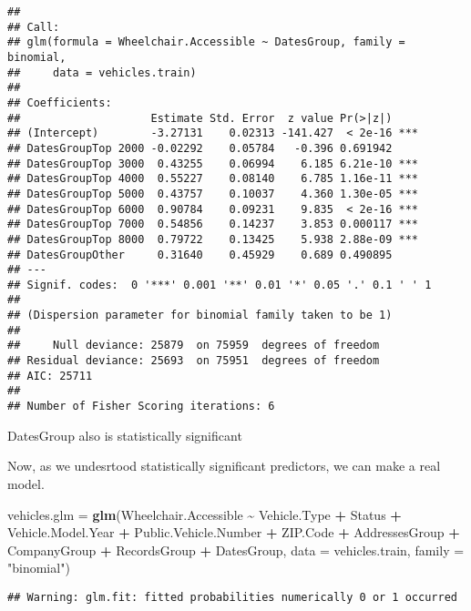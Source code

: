 \documentclass[
]{article}
\newenvironment{Shaded}{\begin{snugshade}}{\end{snugshade}}
\newcommand{\AttributeTok}[1]{\textcolor[rgb]{0.13,0.29,0.53}{#1}}
\newcommand{\FunctionTok}[1]{\textcolor[rgb]{0.13,0.29,0.53}{\textbf{#1}}}
\newcommand{\NormalTok}[1]{#1}
\newcommand{\OtherTok}[1]{\textcolor[rgb]{0.56,0.35,0.01}{#1}}
\newcommand{\SpecialCharTok}[1]{\textcolor[rgb]{0.81,0.36,0.00}{\textbf{#1}}}
\newcommand{\StringTok}[1]{\textcolor[rgb]{0.31,0.60,0.02}{#1}}
\begin{document}
\begin{verbatim}
## 
## Call:
## glm(formula = Wheelchair.Accessible ~ DatesGroup, family = binomial, 
##     data = vehicles.train)
## 
## Coefficients:
##                    Estimate Std. Error  z value Pr(>|z|)    
## (Intercept)        -3.27131    0.02313 -141.427  < 2e-16 ***
## DatesGroupTop 2000 -0.02292    0.05784   -0.396 0.691942    
## DatesGroupTop 3000  0.43255    0.06994    6.185 6.21e-10 ***
## DatesGroupTop 4000  0.55227    0.08140    6.785 1.16e-11 ***
## DatesGroupTop 5000  0.43757    0.10037    4.360 1.30e-05 ***
## DatesGroupTop 6000  0.90784    0.09231    9.835  < 2e-16 ***
## DatesGroupTop 7000  0.54856    0.14237    3.853 0.000117 ***
## DatesGroupTop 8000  0.79722    0.13425    5.938 2.88e-09 ***
## DatesGroupOther     0.31640    0.45929    0.689 0.490895    
## ---
## Signif. codes:  0 '***' 0.001 '**' 0.01 '*' 0.05 '.' 0.1 ' ' 1
## 
## (Dispersion parameter for binomial family taken to be 1)
## 
##     Null deviance: 25879  on 75959  degrees of freedom
## Residual deviance: 25693  on 75951  degrees of freedom
## AIC: 25711
## 
## Number of Fisher Scoring iterations: 6
\end{verbatim}

DatesGroup also is statistically significant

Now, as we undesrtood statistically significant predictors, we can make
a real model.

\begin{Shaded}
\begin{Highlighting}[]
\NormalTok{vehicles.glm }\OtherTok{=} \FunctionTok{glm}\NormalTok{(Wheelchair.Accessible }\SpecialCharTok{\textasciitilde{}}\NormalTok{ Vehicle.Type }\SpecialCharTok{+}\NormalTok{ Status }\SpecialCharTok{+}\NormalTok{ Vehicle.Model.Year }
                   \SpecialCharTok{+}\NormalTok{ Public.Vehicle.Number }\SpecialCharTok{+}\NormalTok{ ZIP.Code }\SpecialCharTok{+}\NormalTok{ AddressesGroup }\SpecialCharTok{+}\NormalTok{ CompanyGroup}
                   \SpecialCharTok{+}\NormalTok{ RecordsGroup }\SpecialCharTok{+}\NormalTok{ DatesGroup, }\AttributeTok{data =}\NormalTok{ vehicles.train, }\AttributeTok{family =} \StringTok{"binomial"}\NormalTok{)}
\end{Highlighting}
\end{Shaded}

\begin{verbatim}
## Warning: glm.fit: fitted probabilities numerically 0 or 1 occurred
\end{verbatim}
\end{document}
